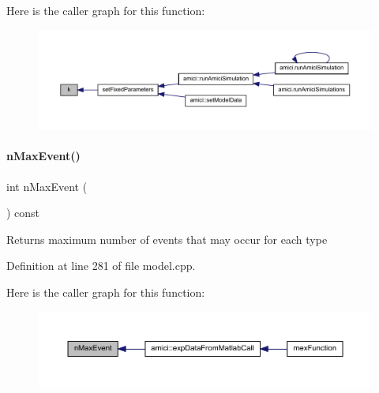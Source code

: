 Here is the caller graph for this function\+:
\nopagebreak
\begin{figure}[H]
\begin{center}
\leavevmode
\includegraphics[width=350pt]{classamici_1_1_model_adde50e0d8a99d20354c8403bf93fab6f_icgraph}
\end{center}
\end{figure}
\mbox{\label{classamici_1_1_model_ac6ea00eafac9ec7be198bca04b19f4c3}} 
\paragraph{\texorpdfstring{n\+Max\+Event()}{nMaxEvent()}}
{\footnotesize\ttfamily int n\+Max\+Event (\begin{DoxyParamCaption}{ }\end{DoxyParamCaption}) const}

\begin{DoxyReturn}{Returns}
maximum number of events that may occur for each type 
\end{DoxyReturn}


Definition at line 281 of file model.\+cpp.

Here is the caller graph for this function\+:
\nopagebreak
\begin{figure}[H]
\begin{center}
\leavevmode
\includegraphics[width=350pt]{classamici_1_1_model_ac6ea00eafac9ec7be198bca04b19f4c3_icgraph}
\end{center}
\end{figure}
\mbox{\label{classamici_1_1_model_a35f06fdd341805405b851788ffe981c4}} 
